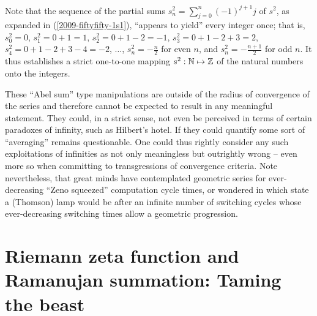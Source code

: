 Note that the sequence of the partial sums $s^2_n=\sum_{j=0}^n (-1)^{j+1} j $
of $s^2$, as expanded in (\ref{2009-fiftyfifty-1s1}),
``appears to yield'' every integer once; that is,
$s^2_0 =0$,
$s^2_1 =0+1=1$,
$s^2_2 =0+1-2=-1$,
$s^2_3 =0+1-2+3=2$,
$s^2_4 =0+1-2+3-4=-2$,
$\ldots$,
$s^2_n =-\frac{n}{2}$ for even $n$,
and
$s^2_n =-\frac{n+1}{2}$ for odd $n$.
It thus establishes a strict one-to-one mapping
$s^2: {\Bbb N} \mapsto {\Bbb Z}$
of the natural numbers onto the integers.

These ``Abel sum'' type manipulations are outside of the radius of convergence
of the series and therefore cannot be expected to
result in any meaningful statement.
They could, in a strict sense, not even be perceived in terms of certain
paradoxes of infinity, such as Hilbert's hotel.
If they could quantify some sort of ``averaging'' remains questionable.
One could thus rightly consider any such
exploitations of infinities
as not only meaningless but outrightly wrong
-- even more so when committing to transgressions of convergence criteria.
Note nevertheless, that great minds have contemplated
geometric series for ever-decreasing ``Zeno squeezed'' computation cycle times,\cite[-30mm]{Russell-36,weyl:49}
or wondered in which state a (Thomson) lamp    would
be after an infinite number of switching cycles
whose ever-decreasing switching times allow a geometric progression.\cite{thom:54}

\section{Riemann zeta function and Ramanujan  summation: Taming the beast}
\label{2019-mm-ds-zetafr}


